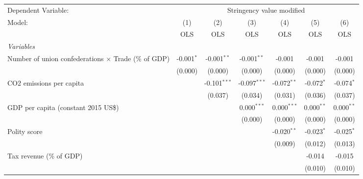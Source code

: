 
\begingroup
\centering
\begin{tabular}{lcccccc}
   \toprule
   Dependent Variable: & \multicolumn{6}{c}{Stringency value modified}\\
   Model:                                                      & (1)          & (2)            & (3)            & (4)           & (5)          & (6)\\  
                                                               &  OLS         & OLS            & OLS            & OLS           & OLS          & OLS\\  
   \midrule
   \emph{Variables}\\
   Number of union confederations $\times$ Trade (\% of GDP)   & -0.001$^{*}$ & -0.001$^{**}$  & -0.001$^{**}$  & -0.001        & -0.001       & -0.001\\   
                                                               & (0.000)      & (0.000)        & (0.000)        & (0.000)       & (0.000)      & (0.000)\\   
   CO2 emissions per capita                                    &              & -0.101$^{***}$ & -0.097$^{***}$ & -0.072$^{**}$ & -0.072$^{*}$ & -0.074$^{*}$\\   
                                                               &              & (0.037)        & (0.034)        & (0.031)       & (0.036)      & (0.037)\\   
   GDP per capita (constant 2015 US\$)                         &              &                & 0.000$^{***}$  & 0.000$^{***}$ & 0.000$^{**}$ & 0.000$^{**}$\\   
                                                               &              &                & (0.000)        & (0.000)       & (0.000)      & (0.000)\\   
   Polity score                                                &              &                &                & -0.020$^{**}$ & -0.023$^{*}$ & -0.025$^{*}$\\   
                                                               &              &                &                & (0.009)       & (0.012)      & (0.013)\\   
   Tax revenue (\% of GDP)                                     &              &                &                &               & -0.014       & -0.015\\   
                                                               &              &                &                &               & (0.010)      & (0.010)\\   

\end{tabular}

